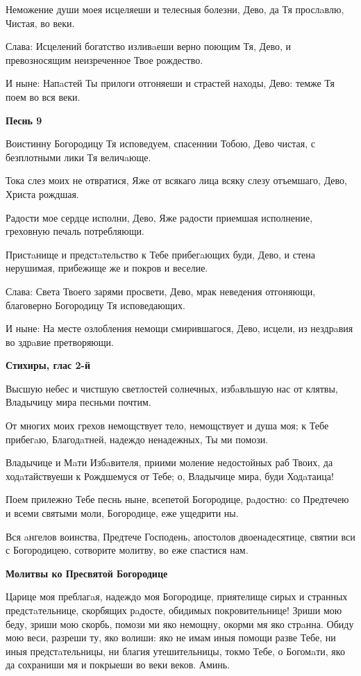 Неможение души моея исцеляеши и телесныя болезни, Дево, да Тя прослaвлю, Чистая, во веки.

Слава: Исцелений богатство изливaеши верно поющим Тя, Дево, и превозносящим неизреченное Твое рождество.

И ныне: Напaстей Ты прилоги отгоняеши и страстей находы, Дево: темже Тя поем во вся веки.


\medskip
\bfseries Песнь 9\normalfont{}\nopagebreak

Воистинну Богородицу Тя исповедуем, спасеннии Тобою, Дево чистая, с безплотными лики Тя величaюще.

Тока слез моих не отвратися, Яже от всякаго лица всяку слезу отъемшаго, Дево, Христа рождшая.

Радости мое сердце исполни, Дево, Яже радости приемшая исполнение, греховную печаль потребляющи.


Пристaнище и предстaтельство к Тебе прибегaющих буди, Дево, и стена нерушимая, прибежище же и покров и веселие.

Слава: Света Твоего зарями просвети, Дево, мрак неведения отгоняющи, благоверно Богородицу Тя исповедающих.

И ныне: На месте озлобления немощи смирившагося, Дево, исцели, из нездрaвия во здрaвие претворяющи.


\medskip
\bfseries Стихиры, глас 2-й\normalfont{}\nopagebreak

Высшую небес и чистшую светлостей солнечных, избaвльшую нас от клятвы, Владычицу мира песньми почтим.

От многих моих грехов немощствует тело, немощствует и душа моя; к Тебе прибегaю, Благодaтней, надеждо ненадежных, Ты ми помози.

Владычице и Мaти Избaвителя, приими моление недостойных раб Твоих, да ходaтайствуеши к Рождшемуся от Тебе; о, Владычице мира, буди Ходaтаица!

Поем прилежно Тебе песнь ныне, всепетой Богородице, рaдостно: со Предтечею и всеми святыми моли, Богородице, еже ущедрити ны.

Вся aнгелов воинства, Предтече Господень, апостолов двоенадесятице, святии вси с Богородицею, сотворите молитву, во еже спастися нам.


\medskip
\bfseries Молитвы ко Пресвятой Богородице\normalfont{}\nopagebreak


Царице моя преблагaя, надеждо моя Богородице, приятелище сирых и странных предстaтельнице, скорбящих рaдосте, обидимых покровительнице! Зриши мою беду, зриши мою скорбь, помози ми яко немощну, окорми мя яко стрaнна. Обиду мою веси, разреши ту, яко волиши: яко не имам иныя помощи разве Тебе, ни иныя предстaтельницы, ни благия утешительницы, токмо Тебе, о Богомaти, яко да сохраниши мя и покрыеши во веки веков. Аминь.


